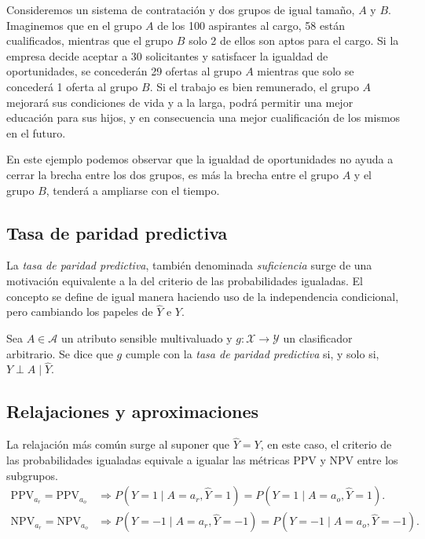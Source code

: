\documentclass[oneside,openright,titlepage,numbers=noenddot,openany,headinclude,footinclude=true,
cleardoublepage=empty,abstractoff,BCOR=5mm,paper=a4,fontsize=12pt,main=spanish]{scrreprt}
\begin{document}
\begin{example}
Consideremos un sistema de contratación y dos grupos de igual tamaño, $A$ y $B$. Imaginemos que en el grupo $A$ de los 100 aspirantes al cargo, 58 están cualificados, mientras que el grupo $B$ solo 2 de ellos son aptos para el cargo. Si la empresa decide aceptar a 30 solicitantes y satisfacer la igualdad de oportunidades, se concederán 29 ofertas al grupo $A$ mientras que solo se concederá 1 oferta al grupo $B$. Si el trabajo es bien remunerado, el grupo $A$ mejorará sus condiciones de vida y a la larga, podrá permitir una mejor educación para sus hijos, y en consecuencia una mejor cualificación de los mismos en el futuro. 

En este ejemplo podemos observar que la igualdad de oportunidades no ayuda a cerrar la brecha entre los dos grupos, es más la brecha entre el grupo $A$ y el grupo $B$, tenderá a ampliarse con el tiempo. 
\end{example}

\subsection{Tasa de paridad predictiva} \label{subsec:suficiencia}

La \textit{tasa de paridad predictiva}, también denominada \textit{suficiencia} surge de una motivación equivalente a la del criterio de las probabilidades igualadas. El concepto se define de igual manera haciendo uso de la independencia condicional, pero cambiando los papeles de $\hat{Y}$ e $Y$. \\

\begin{definition}
Sea $A \in \mathcal{A}$ un atributo sensible multivaluado y $g\colon \mathcal{X} \to \mathcal{Y}$ un clasificador arbitrario. Se dice que $g$ cumple con la \textit{tasa de paridad predictiva} si, y solo si, $Y \perp A \mid \hat{Y}$.
\end{definition}

\subsection*{Relajaciones y aproximaciones}

La relajación más común surge al suponer que $\hat{Y}=Y$, en este caso, el criterio de las probabilidades igualadas equivale a igualar las métricas PPV y NPV entre los subgrupos. 
\begin{equation*}
\begin{split}
\text{PPV}_{a_r}=\text{PPV}_{a_o} &\Rightarrow P(Y=1 \mid A=a_r, \hat{Y}=1)=P(Y=1 \mid A=a_o, \hat{Y}=1).\\
\text{NPV}_{a_r}=\text{NPV}_{a_o} &\Rightarrow P(Y=-1 \mid A=a_r,\hat{Y}=-1)=P(Y=-1 \mid A=a_o,\hat{Y}=-1).
\end{split}
\end{equation*}
\end{document}
